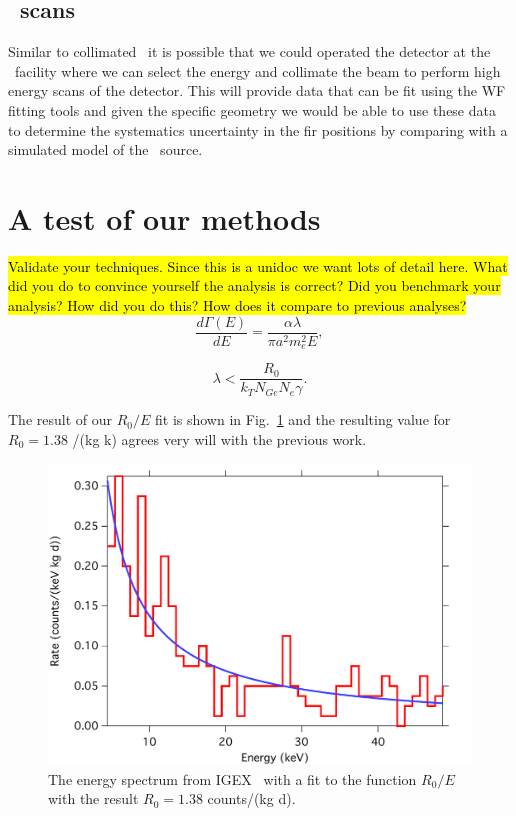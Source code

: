 \documentclass[groupedaddress,rmp,amsmath,amssymb,bibnotes,altaffilletter,twocolumn]{revtex4-1}
\newcommand{\hlc}[2][yellow]{ {\sethlcolor{#1} \hl{#2}} }
\begin{document}
\subsection{\Higgs~scans}

Similar to collimated \cosixty~it is possible that we could operated the detector at the \Higgs~facility where we can select the energy and collimate the beam to perform high energy scans of the detector. This will provide data that can be fit using the WF fitting tools and given the specific geometry we would be able to use these data to determine the systematics uncertainty in the fir positions by comparing with a simulated model of the \Higgs~source. 

\section{A test of our methods}

\hlc[blueh]{Validate your techniques. Since this is a unidoc we want lots of detail here. What did you do to convince yourself the analysis is correct? Did you benchmark your analysis? How did you do this? How does it compare to previous analyses?
}
%
\begin{equation}
\frac{d\Gamma(E)}{dE} = \frac{\alpha \lambda}{\pi a^2 m^2_e E},
\label{eqn:rate1}
\end{equation}
%
\lipsum[2-2] 

\begin{equation}
\lambda < \frac{R_0}{k_T N_{Ge} N_e \gamma}.
\label{eqn:rateExpUnits2}
\end{equation}
%
\lipsum[3-3]


The result of our $R_0/E$ fit is shown in Fig.~\ref{fig:IGEXfit} and the resulting value for $R_0=1.38$ /(kg k) agrees very will with the previous work. 

\begin{figure}[t]
 \centering
 \includegraphics[width=1.0\columnwidth]{figs/IGEXfit.pdf}
 \caption{The energy spectrum from IGEX~\cite{Morales2002} with a fit to the function $R_0/E$ with the result $R_0=1.38$ counts/(kg d).}
 \label{fig:IGEXfit}
\end{figure}
\end{document}
